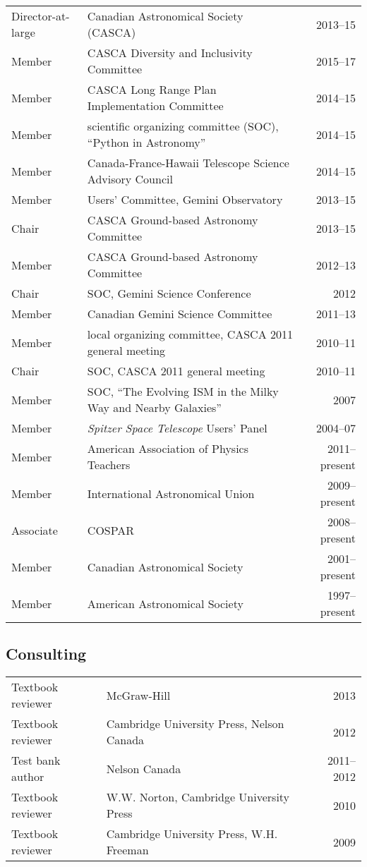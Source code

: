 \documentclass[12pt]{article}
\begin{document}
\vspace{0.5cm}
\begin{tabularx}{\textwidth}{lXr}
Director-at-large& Canadian Astronomical Society (CASCA)& 2013--15\\
Member& CASCA Diversity and Inclusivity Committee& 2015--17\\
Member& CASCA Long Range Plan Implementation Committee& 2014--15\\
Member& scientific organizing committee (SOC), ``Python in Astronomy'' & 2014--15\\
Member& Canada-France-Hawaii Telescope Science Advisory Council& 2014--15\\
Member&  Users' Committee, Gemini Observatory& 2013--15\\
Chair& CASCA Ground-based Astronomy Committee& 2013--15\\
Member& CASCA Ground-based Astronomy Committee& 2012--13\\
Chair& SOC, Gemini Science Conference& 2012\\
Member& Canadian Gemini Science Committee& 2011--13\\
Member& local organizing committee, CASCA 2011 general meeting&2010--11\\
Chair& SOC, CASCA 2011 general meeting&2010--11\\
Member& SOC, ``The Evolving ISM in the Milky Way and Nearby Galaxies'' & 2007\\
Member& {\it Spitzer Space Telescope} Users' Panel& 2004--07\\
Member& American Association of Physics Teachers& 2011--present\\
Member& International Astronomical Union& 2009--present\\
Associate& COSPAR& 2008--present\\
Member& Canadian Astronomical Society& 2001--present\\
Member& American Astronomical Society& 1997--present
\end{tabularx}

\subsection{Consulting}
\begin{tabularx}{\textwidth}{lXr}
Textbook reviewer& McGraw-Hill& 2013\\
Textbook reviewer & Cambridge University Press, Nelson Canada&2012\\
Test bank author& Nelson Canada& 2011--2012\\
Textbook reviewer& W.W. Norton, Cambridge University Press& 2010\\
Textbook reviewer& Cambridge University Press, W.H. Freeman& 2009
\end{tabularx}
\end{document}
